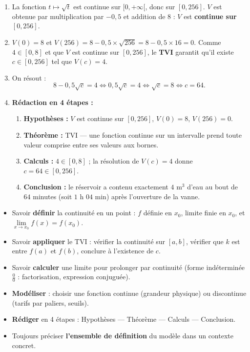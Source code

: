 \documentclass[11pt]{article}
\begin{document}
\begin{corrige}
\begin{enumerate}
\item La fonction $t\mapsto\sqrt{t}$ est continue sur $[0,+\infty[$, donc sur $[0,256]$. $V$ est obtenue par multiplication par $-0,5$ et addition de $8$ : $V$ est \textbf{continue sur $[0,256]$}.
\item $V(0)=8$ et $V(256)=8-0,5\times\sqrt{256}=8-0,5\times16=0$. Comme $4\in[0,8]$ et que $V$ est continue sur $[0,256]$, le \textbf{TVI} garantit qu'il existe $c\in[0,256]$ tel que $V(c)=4$.
\item On résout :
\[
8-0,5\sqrt{c}=4 \iff 0,5\sqrt{c}=4 \iff \sqrt{c}=8 \iff c=64.
\]
\item \textbf{Rédaction en 4 étapes :}
\begin{enumerate}
\item \textbf{Hypothèses :} $V$ est continue sur $[0,256]$, $V(0)=8$, $V(256)=0$.
\item \textbf{Théorème :} TVI — une fonction continue sur un intervalle prend toute valeur comprise entre ses valeurs aux bornes.
\item \textbf{Calculs :} $4\in[0,8]$ ; la résolution de $V(c)=4$ donne $c=64\in[0,256]$.
\item \textbf{Conclusion :} le réservoir a contenu exactement $4$ m$^3$ d'eau au bout de $64$ minutes (soit $1$ h $04$ min) après l'ouverture de la vanne.
\end{enumerate}
\end{enumerate}
\end{corrige}

\begin{aretenir}
\begin{itemize}
\item[$\square$] Savoir \textbf{définir} la continuité en un point : $f$ définie en $x_0$, limite finie en $x_0$, et $\lim\limits_{x\to x_0}f(x)=f(x_0)$.
\item[$\square$] Savoir \textbf{appliquer} le TVI : vérifier la continuité sur $[a,b]$, vérifier que $k$ est entre $f(a)$ et $f(b)$, conclure à l'existence de $c$.
\item[$\square$] Savoir \textbf{calculer} une limite pour prolonger par continuité (forme indéterminée $\frac{0}{0}$ : factorisation, expression conjuguée).
\item[$\square$] \textbf{Modéliser} : choisir une fonction continue (grandeur physique) ou discontinue (tarifs par paliers, seuils).
\item[$\square$] \textbf{Rédiger} en 4 étapes : Hypothèses — Théorème — Calculs — Conclusion.
\item[$\square$] Toujours préciser \textbf{l'ensemble de définition} du modèle dans un contexte concret.
\end{itemize}
\end{aretenir}
\end{document}
